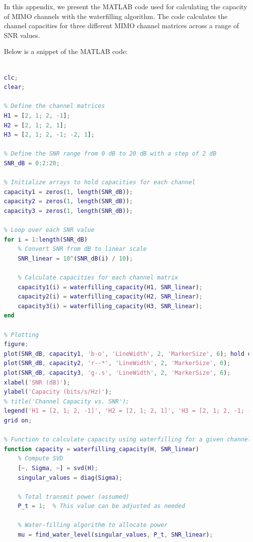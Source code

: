 \documentclass[lettersize,journal]{IEEEtran}
\begin{document}

In this appendix, we present the MATLAB code used for calculating the capacity of MIMO channels with the waterfilling algorithm. The code calculates the channel capacities for three different MIMO channel matrices across a range of SNR values.

Below is a snippet of the MATLAB code:

\begin{lstlisting}[language=Matlab]
% MIMO Channel Capacity Calculation using Waterfilling Algorithm

clc;
clear;

% Define the channel matrices
H1 = [2, 1; 2, -1];
H2 = [2, 1; 2, 1];
H3 = [2, 1; 2, -1; -2, 1];

% Define the SNR range from 0 dB to 20 dB with a step of 2 dB
SNR_dB = 0:2:20;

% Initialize arrays to hold capacities for each channel
capacity1 = zeros(1, length(SNR_dB));
capacity2 = zeros(1, length(SNR_dB));
capacity3 = zeros(1, length(SNR_dB));

% Loop over each SNR value
for i = 1:length(SNR_dB)
    % Convert SNR from dB to linear scale
    SNR_linear = 10^(SNR_dB(i) / 10);
    
    % Calculate capacities for each channel matrix
    capacity1(i) = waterfilling_capacity(H1, SNR_linear);
    capacity2(i) = waterfilling_capacity(H2, SNR_linear);
    capacity3(i) = waterfilling_capacity(H3, SNR_linear);
end

% Plotting
figure;
plot(SNR_dB, capacity1, 'b-o', 'LineWidth', 2, 'MarkerSize', 6); hold on;
plot(SNR_dB, capacity2, 'r--*', 'LineWidth', 2, 'MarkerSize', 6);
plot(SNR_dB, capacity3, 'g-.s', 'LineWidth', 2, 'MarkerSize', 6);
xlabel('SNR (dB)');
ylabel('Capacity (bits/s/Hz)');
% title('Channel Capacity vs. SNR');
legend('H1 = [2, 1; 2, -1]', 'H2 = [2, 1; 2, 1]', 'H3 = [2, 1; 2, -1; -2, 1]', 'Location', 'northwest');
grid on;

% Function to calculate capacity using waterfilling for a given channel matrix and SNR
function capacity = waterfilling_capacity(H, SNR_linear)
    % Compute SVD
    [~, Sigma, ~] = svd(H);
    singular_values = diag(Sigma);
    
    % Total transmit power (assumed)
    P_t = 1;  % This value can be adjusted as needed

    % Water-filling algorithm to allocate power
    mu = find_water_level(singular_values, P_t, SNR_linear);


\end{lstlisting}
\end{document}
